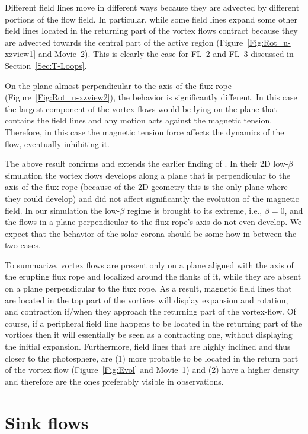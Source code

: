 \documentclass[apj]{emulateapj}
\begin{document}
Different field lines move in different ways because they are advected by different portions of the flow field. In particular, while some field lines expand some other field lines located in the returning part of the vortex flows contract because they are advected towards the central part of the active region (Figure~\ref{Fig:Rot_u-xzview1} and Movie~2). This is clearly the case for FL~2 and FL~3 discussed in Section~\ref{Sec:T-Loops}.  

On the plane almost perpendicular  to the axis of the flux rope (Figure~\ref{Fig:Rot_u-xzview2}), the behavior is significantly different. In this case the largest component of the vortex flows would be lying on the plane that contains the field lines and any motion acts against the magnetic tension. Therefore, in this case the magnetic tension force affects the dynamics of the flow, eventually inhibiting it. 

The above result confirms and extends the earlier finding of \cite{For1990}. In their 2D low-$\beta$ simulation the vortex flows develops along a plane that is perpendicular to the axis of the flux rope (because of the 2D geometry this is the only plane where they could develop) and did not affect significantly the evolution of the magnetic field. In our simulation the low-$\beta$ regime is brought to its extreme, i.e., $\beta=0$, and the flows in a plane perpendicular to the flux rope's axis do not even develop. We expect that the behavior  of the solar corona should be some how in between the two cases. 

To summarize, vortex flows are present only on a plane aligned with the axis of the erupting flux rope and localized around the flanks of it,  while they are absent on a plane perpendicular to the flux rope. As a result, magnetic field lines that are located in the top part of the vortices will display expansion and rotation, and contraction if/when they approach the returning part of the vortex-flow. Of course, if a peripheral field line happens to be located in the returning part of the vortices then it will essentially be seen as a contracting one, without displaying the initial expansion.  Furthermore, field lines that are highly inclined and thus closer to the photosphere, are (1) more probable to be located in the return part of the vortex flow (Figure~\ref{Fig:Evol} and Movie~1) and (2) have a higher density and therefore are the ones preferably visible in observations.

\section{Sink flows}
\label{Sec:T-Inflow}
\end{document}
